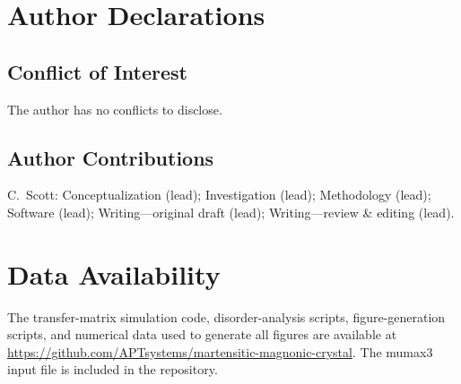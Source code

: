 \documentclass[aip,jap,reprint,floatfix,nofootinbib]{revtex4-2}
\begin{document}
\section*{Author Declarations}

\subsection*{Conflict of Interest}

The author has no conflicts to disclose.

\subsection*{Author Contributions}

C.~Scott: Conceptualization (lead); Investigation (lead); Methodology (lead); Software (lead); Writing---original draft (lead); Writing---review \& editing (lead).

\section*{Data Availability}
The transfer-matrix simulation code, disorder-analysis scripts, figure-generation scripts, and numerical data used to generate all figures are available at \url{https://github.com/APTsystems/martensitic-magnonic-crystal}. The mumax3 input file is included in the repository.



\end{document}
